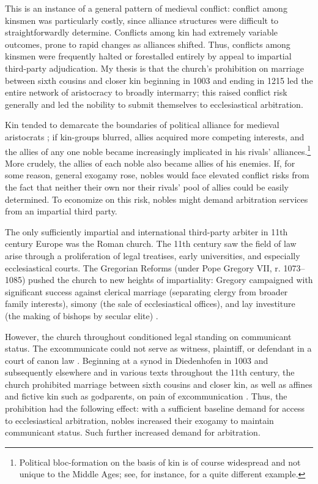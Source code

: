\documentclass[12pt]{article}
\theoremstyle{definition}
\theoremstyle{remark}
\begin{document}
This is an instance of a general pattern of medieval conflict: conflict among kinsmen was particularly costly, since alliance structures were difficult to straightforwardly determine. Conflicts among kin had extremely variable outcomes, prone to rapid changes as alliances shifted. Thus, conflicts among kinsmen were frequently halted or forestalled entirely by appeal to impartial third-party adjudication. My thesis is that the church's prohibition on marriage between sixth cousins and closer kin beginning in 1003 and ending in 1215 led the entire network of aristocracy to broadly intermarry; this raised conflict risk generally and led the nobility to submit themselves to ecclesiastical arbitration.

Kin tended to demarcate the boundaries of political alliance for medieval aristocrats \citep{bloch_1961, duby_1978, bartlett_1993, bartlett_2020}; if kin-groups blurred, allies acquired more competing interests, and the allies of any one noble became increasingly implicated in his rivals’ alliances.\footnote{Political bloc-formation on the basis of kin is of course widespread and not unique to the Middle Ages; see, for instance, \citet{moscona_nunn_robinson_2020} for a quite different example.} More crudely, the allies of each noble also became allies of his enemies. If, for some reason, general exogamy rose, nobles would face elevated conflict risks from the fact that neither their own nor their rivals' pool of allies could be easily determined. To economize on this risk, nobles might demand arbitration services from an impartial third party.

The only sufficiently impartial and international third-party arbiter in 11th century Europe was the Roman church. The 11th century saw the field of law arise through a proliferation of legal treatises, early universities, and especially ecclesiastical courts. The Gregorian Reforms (under Pope Gregory VII, r. 1073--1085) pushed the church to new heights of impartiality: Gregory campaigned with significant success against clerical marriage (separating clergy from broader family interests), simony (the sale of ecclesiastical offices), and lay investiture (the making of bishops by secular elite) \citep{berman_1983}. 

However, the church throughout conditioned legal standing on communicant status. The excommunicate could not serve as witness, plaintiff, or defendant in a court of canon law \citep{helmholz_1982, vodola_1986}. Beginning at a synod in Diedenhofen in 1003 and subsequently elsewhere and in various texts throughout the 11th century, the church prohibited marriage between sixth cousins and closer kin, as well as affines and fictive kin such as godparents, on pain of excommunication \citep{davray_2005, ubl_2008, schulz_2019, henrich_2020}. Thus, the prohibition had the following effect: with a sufficient baseline demand for access to ecclesiastical arbitration, nobles increased their exogamy to maintain communicant status. Such further increased demand for arbitration.
\end{document}
